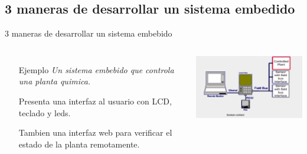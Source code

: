\documentclass[8pt,aspectratio=169,compress]{beamer}
\begin{document}
\subsection{3 maneras de desarrollar un sistema embedido}


\begin{frame}{3 maneras de desarrollar un sistema embebido}

    \begin{columns}[onlytextwidth,T]
      \column{\dimexpr\linewidth-70mm-5mm}

\begin{itemize}
\item [Ejemplo] \textit{Un sistema embebido que controla una planta quimica.}

\bigskip
Presenta una interfaz al usuario con LCD, teclado y leds. 

\bigskip
Tambien una interfaz web para verificar el estado de la planta remotamente.

\end{itemize}

      \column{75mm}

     \includegraphics[width=80mm]{images/hipotetico-sistema2.jpg}
    \end{columns}
\end{frame}
\end{document}
